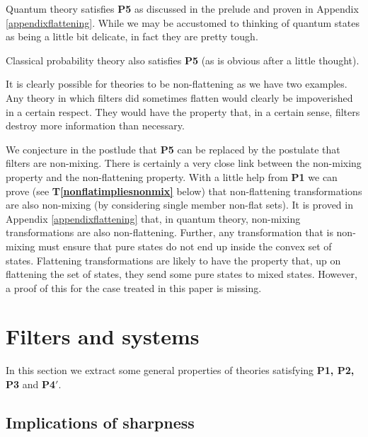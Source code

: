 \documentclass[10pt]{article}
\begin{document}
Quantum theory satisfies {\bf P5} as discussed in the prelude and proven in Appendix \ref{appendixflattening}. While we may be accustomed to thinking of quantum states as being a little bit delicate, in fact they are pretty tough.

Classical probability theory also satisfies {\bf P5} (as is obvious after a little thought).

It is clearly possible for theories to be non-flattening as we have two examples.  Any theory in which filters did sometimes flatten would clearly be impoverished in a certain respect.  They would have the property that, in a certain sense, filters destroy more information than necessary.  

We conjecture in the postlude that {\bf P5}  can be replaced by the postulate that filters are non-mixing.  There is certainly a very close link between the non-mixing property and the non-flattening property.  With a little help from {\bf P1} we can prove (see {\bf T\ref{nonflatimpliesnonmix}} below) that non-flattening transformations are also non-mixing (by considering single member non-flat sets). It is proved in Appendix \ref{appendixflattening} that, in quantum theory, non-mixing transformations are also non-flattening.  Further, any transformation that is non-mixing must ensure that pure states do not end up inside the convex set of states.  Flattening transformations are likely to have the property that, up on flattening the set of states, they send some pure states to mixed states.  However, a proof of this for the case treated in this paper is missing.


\section{Filters and systems}\label{filtersandsystemssection}

In this section we extract some general properties of theories satisfying {\bf P1, P2, P3} and {\bf P4}$'$.





\subsection{Implications of sharpness}\label{uniqueimplications}
\end{document}

